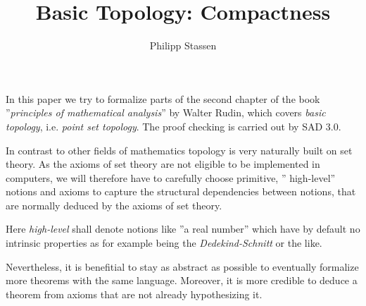 \documentclass[10pt]{article}
\title{Basic Topology: Compactness}
\author{Philipp Stassen}
\theoremstyle{definition}
\theoremstyle{plain}
\theoremstyle{remark}
\begin{document}
\maketitle

In this paper we try to formalize parts of the second chapter of the book ''\emph{principles of mathematical analysis}'' by Walter Rudin, which covers \emph{basic topology}, i.e. \emph{point set topology}. The proof checking is carried out by SAD 3.0.

In contrast to other fields of mathematics topology is very naturally built on set theory. As the axioms of set theory are not eligible to be implemented in computers, we will therefore have to carefully choose primitive, '' high-level'' notions and axioms to capture the structural dependencies between notions, that are normally deduced by the axioms of set theory. 

Here \emph{high-level} shall denote notions like ''a real number'' which have by default no intrinsic properties as for example being the \emph{Dedekind-Schnitt} or the like.

Nevertheless, it is benefitial to stay as abstract as possible to eventually formalize more theorems with the same language. Moreover, it is more credible to deduce a theorem from axioms that are not already hypothesizing it. \medskip
\end{document}
